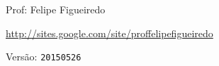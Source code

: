\documentclass[a4paper]{article}
\begin{document}
\parbox[c]{.825\textwidth}{\raggedright%
{Prof: Felipe Figueiredo\par}
{\url{http://sites.google.com/site/proffelipefigueiredo}\par}
}

Versão: \verb|20150526|



\section{}


\section{}
\end{document}
